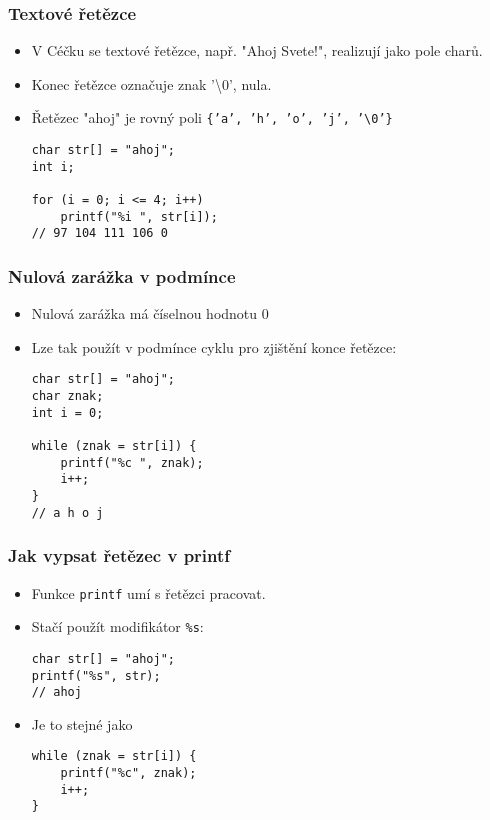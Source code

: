 \documentclass{beamer}
\newenvironment{itemizex}%
  {\large \begin{itemize}%
    \setlength{\itemsep}{8pt}%
    \setlength{\parskip}{8pt}}%
  {\end{itemize}}
\begin{document}
\begin{frame}[t,fragile]\frametitle{Textové řetězce} 
    \begin{itemize}
        \item V Céčku se textové řetězce, např. "Ahoj Svete!", realizují jako pole charů.
        \item Konec řetězce označuje znak '\textbackslash0', nula.
        \item Řetězec "ahoj" je rovný poli \texttt{\{'a', 'h', 'o', 'j', '\textbackslash0'\}}
        \begin{verbatim} 
char str[] = "ahoj";
int i;

for (i = 0; i <= 4; i++) 
    printf("%i ", str[i]);
// 97 104 111 106 0
        \end{verbatim}
    \end{itemize}
\end{frame}


\begin{frame}[t,fragile]\frametitle{Nulová zarážka v podmínce} 
    \begin{itemizex}
        \item Nulová zarážka má číselnou hodnotu 0
        \item Lze tak použít v podmínce cyklu pro zjištění konce řetězce:
        \begin{verbatim} 
char str[] = "ahoj";
char znak;
int i = 0;

while (znak = str[i]) {
    printf("%c ", znak);
    i++;
}
// a h o j 
        \end{verbatim}
    \end{itemizex}
\end{frame}



\begin{frame}[t,fragile]\frametitle{Jak vypsat řetězec v printf} 
    \begin{itemizex}
        \item Funkce \texttt{printf} umí s řetězci pracovat.
        \item Stačí použít modifikátor \texttt{\%s}:
        \begin{verbatim} 
char str[] = "ahoj";
printf("%s", str);
// ahoj
        \end{verbatim}
        \item Je to stejné jako
        \begin{verbatim} 
while (znak = str[i]) {
    printf("%c", znak);
    i++;
}
        \end{verbatim}
    \end{itemizex}
\end{frame}
\end{document}
